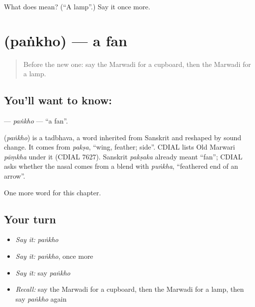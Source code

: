 \begin{tcolorbox}[breakable,colback=teal!4,colframe=teal!35!black,title={Before you move on}]
What does  mean? (\textquotedblleft{}A lamp\textquotedblright{}.) Say it once more.
\end{tcolorbox}
\section[\texorpdfstring{\mw{पंखो} (paṅkho)}{पंखो (paṅkho)}]{ (paṅkho) — a fan}

\label{lesson:MW-C63-pankho}



\begin{quote}
Before the new one: say the Marwadi for a cupboard, then the Marwadi for a lamp.
\end{quote}

\subsection*{You'll want to know: }
\textbf{} — \emph{paṅkho} — \textquotedblleft{}a fan\textquotedblright{}.

\begin{cousinweb}
\textbf{} (\emph{paṅkho}) is a tadbhava, a word inherited from Sanskrit and reshaped by sound change. It comes from \emph{pakṣa}, \textquotedblleft{}wing, feather; side\textquotedblright{}. CDIAL lists Old Marwari \emph{pāṃkha} under it (CDIAL 7627). Sanskrit \emph{pakṣaka} already meant \textquotedblleft{}fan\textquotedblright{}; CDIAL asks whether the nasal comes from a blend with \emph{puṅkha}, \textquotedblleft{}feathered end of an arrow\textquotedblright{}.
\end{cousinweb}

\begin{grammarlens}[title={What you've built}]
One more word for this chapter.
\end{grammarlens}

\subsection*{Your turn}
\begin{itemize}
\raggedright
  \item \emph{Say it:} \emph{paṅkho}
  \item \emph{Say it:} \emph{paṅkho}, once more
  \item \emph{Say it:} say \emph{paṅkho}
  \item \emph{Recall:} say the Marwadi for a cupboard, then the Marwadi for a lamp, then say \emph{paṅkho} again
\end{itemize}

